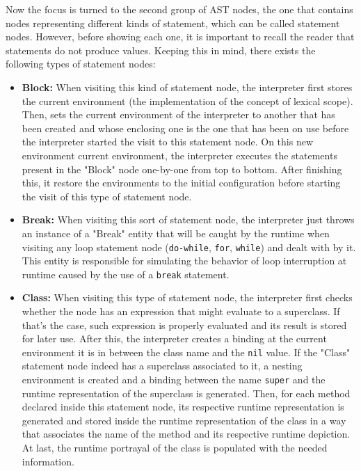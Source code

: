 Now the focus is turned to the second group of AST nodes, the one that contains nodes representing different kinds of statement, which can be called statement nodes. However, before showing each one, it is important to recall the reader that statements do not produce values. Keeping this in mind, there exists the following types of statement nodes:
\begin{itemize}
    \item \textbf{Block:} When visiting this kind of statement node, the interpreter first stores the current environment (the implementation of the concept of lexical scope). Then, sets the current environment of the interpreter to another that has been created and whose enclosing one is the one that has been on use before the interpreter started the visit to this statement node. On this new environment current environment, the interpreter executes the statements present in the "Block" node one-by-one from top to bottom. After finishing this, it restore the environments to the initial configuration before starting the visit of this type of statement node.
    \item \textbf{Break:} When visiting this sort of statement node, the interpreter just throws an instance of a "Break" entity that will be caught by the runtime when visiting any loop statement node (\texttt{do-while}, \texttt{for}, \texttt{while}) and dealt with by it. This entity is responsible for simulating the behavior of loop interruption at runtime caused by the use of a \texttt{break} statement.
    
    \item \textbf{Class:} When visiting this type of statement node, the interpreter first checks whether the node has an expression that might evaluate to a superclass. If that's the case, such expression is properly evaluated and its result is stored for later use. After this, the interpreter creates a binding at the current environment it is in between the class name and the \texttt{nil} value. If the "Class" statement node indeed has a superclass associated to it, a nesting environment is created and a binding between the name \texttt{super} and the runtime representation of the superclass is generated. Then, for each method declared inside this statement node, its respective runtime representation is generated and stored inside the runtime representation of the class in a way that associates the name of the method and its respective runtime depiction. At last, the runtime portrayal of the class is populated with the needed information.
    

\end{itemize}
